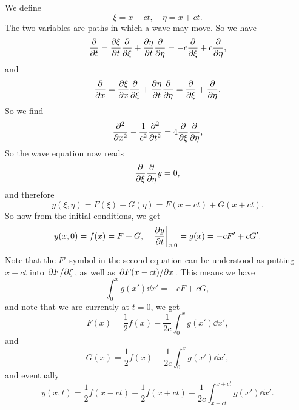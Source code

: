 \documentclass[hyperref, a4paper]{article}
\begin{document}
We define 
\begin{equation}
    \xi = x - ct, \quad \eta = x + ct.
\end{equation}
The two variables are paths in which a wave may move.
So we have 
\[
    \pdv{t} = \pdv{\xi}{t} \pdv{\xi} + \pdv{\eta}{t} \pdv{\eta}
    = - c \pdv{\xi} + c \pdv{\eta} , 
\]
and 
\[
    \pdv{x} = \pdv{\xi}{x} \pdv{\xi} + \pdv{\eta}{t} \pdv{\eta}
    = \pdv{\xi} + \pdv{\eta}.
\]
So we find 
\[
    \pdv[2]{x} - \frac{1}{c^2} \pdv[2]{t} = 
    4 \pdv{\xi} \pdv{\eta},
\]
So the wave equation now reads 
\[
    \pdv{\xi} \pdv{\eta} y = 0,
\]
and therefore 
\begin{equation}
    y(\xi, \eta) = F(\xi) + G(\eta)
    = F(x - ct) + G(x + ct).
\end{equation}
So now from the initial conditions, we get 
\[
    y(x, 0) = f(x) = F + G, \quad 
    \eval{\pdv{y}{t}}_{x, 0} = g(x) = - c F' + c G'.
\]
Note that the $F'$ symbol in the second equation
can be understood as putting $x - ct$ into $\pdv*{F}{\xi}$,
as well as $\pdv*{F(x - ct)}{x}$.
This means we have 
\[
    \int_{0}^{x} g(x') \dd{x'} = - c F + c G,
\]
and note that we are currently at $t = 0$, we get 
\[
    F(x) = \frac{1}{2} f(x) - \frac{1}{2c} \int_{0}^{x} g(x') \dd{x'}, 
\]
and 
\[
    G(x) = \frac{1}{2} f(x) + \frac{1}{2c} \int_{0}^{x} g(x') \dd{x'},
\]
and eventually
\begin{equation}
    y(x, t) = \frac{1}{2} f(x - ct) + \frac{1}{2} f(x + ct)
    + \frac{1}{2c} \int_{x - ct}^{x + ct} g(x') \dd{x'}.
\end{equation}
\end{document}
